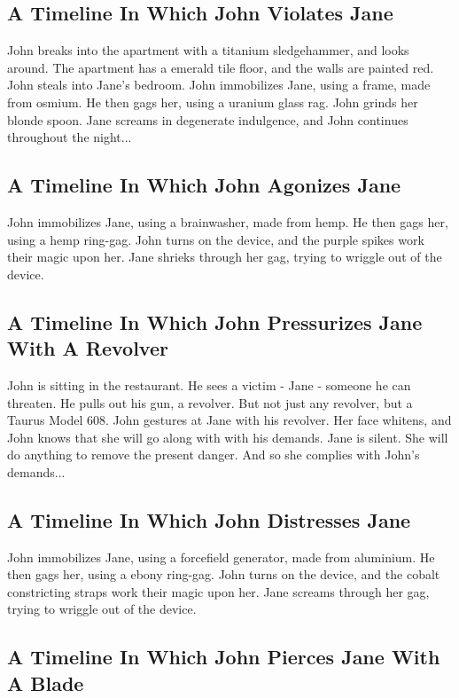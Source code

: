 \documentclass{article}
\begin{document}
\subsection{A Timeline In Which John Violates Jane}


John breaks into the apartment with a titanium sledgehammer, and looks around.
The apartment has a emerald tile floor, and the walls are painted red.
John steals into Jane's bedroom.
John immobilizes Jane, using a frame, made from osmium.
He then gags her, using a uranium glass rag.
John grinds her blonde spoon.
Jane screams in degenerate indulgence, and John continues throughout the night...
\subsection{A Timeline In Which John Agonizes Jane}


John immobilizes Jane, using a brainwasher, made from hemp.
He then gags her, using a hemp ring{-}gag.
John turns on the device, and the purple spikes work their magic upon her.
Jane shrieks through her gag, trying to wriggle out of the device.
\subsection{A Timeline In Which John Pressurizes Jane With A Revolver}


John is sitting in the restaurant.
He sees a victim {-} Jane {-} someone he can threaten. He pulls out his gun, a revolver.
But not just any revolver, but a Taurus Model 608.
John gestures at Jane with his revolver. Her face whitens, and John knows that she will go along with with his demands.
Jane is silent. She will do anything to remove the present danger. And so she complies with John's demands...
\subsection{A Timeline In Which John Distresses Jane}


John immobilizes Jane, using a forcefield generator, made from aluminium.
He then gags her, using a ebony ring{-}gag.
John turns on the device, and the cobalt constricting straps work their magic upon her.
Jane screams through her gag, trying to wriggle out of the device.
\subsection{A Timeline In Which John Pierces Jane With A Blade}
\end{document}
